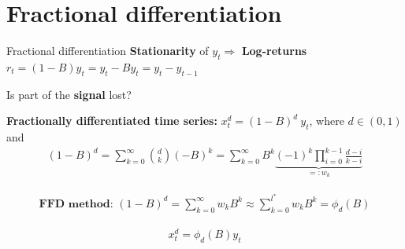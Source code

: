 \documentclass[usenames,dvipsnames]{beamer} %
\newcommand{\homeCTwo}{../../Chapter 2 - FracDiff/Draft}
\begin{document}
\section{Fractional differentiation}
\frame{\tableofcontents[currentsection]}

\begin{frame}{Fractional differentiation}
\textbf{Stationarity} of $y_t \Rightarrow$ \textbf{Log-returns} $r_t = 
(1-B)y_t = y_t - B y_t = y_t - y_{t-1}$

\vspace{.25cm}
Is part of the \textbf{signal} lost?

%

\vspace{.25cm}
\textbf{Fractionally differentiated time series:} $x_t^d = (1-B)^d \ y_t$, 
where $d \in (0,1)$ and
\begin{align*}
	(1 - B)^d = \sum_{k = 0}^{\infty} \binom{d}{k} (-B)^k
	= \sum_{k = 0}^{\infty} B^k \underbrace{(-1)^k \prod_{i = 0}^{k - 1} 
	\frac{d - i}{k - i}}_{=: w_k}
\end{align*}

\vspace{-.4cm}
\begin{align*}
	\textbf{FFD method: } (1 - B)^d = \sum_{k = 0}^{\infty} w_k B^k \approx 
	\sum_{k=0}^{l^*} w_k B^k = \phi_d(B)
\end{align*}

\vspace{-.4cm}
\begin{align*}
	x_t^d = \phi_d(B) y_t
\end{align*}	

\end{frame}

%	
%
%	
%	
%
%
\end{document}

